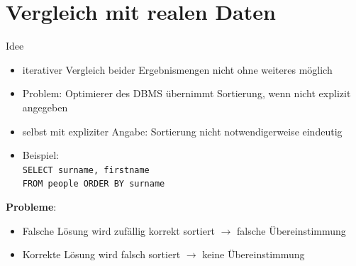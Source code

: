 \documentclass{beamer}
\begin{document}
\section{Vergleich mit realen Daten}



\begin{frame}[fragile]{Idee}
\begin{itemize}
\item iterativer Vergleich beider Ergebnismengen nicht ohne weiteres möglich
\item Problem: Optimierer des DBMS übernimmt Sortierung, wenn nicht explizit angegeben
\item selbst mit expliziter Angabe: Sortierung nicht notwendigerweise eindeutig
\item Beispiel: \\\verb|SELECT surname, firstname|\\\verb|FROM people ORDER BY surname|
\end{itemize}
\textbf{Probleme}:\pause\\
\begin{itemize}
\item Falsche Lösung wird zufällig korrekt sortiert $\to$ falsche Übereinstimmung
\item Korrekte Lösung wird falsch sortiert $\to$ keine Übereinstimmung 
\end{itemize}
\end{frame}
\end{document}
